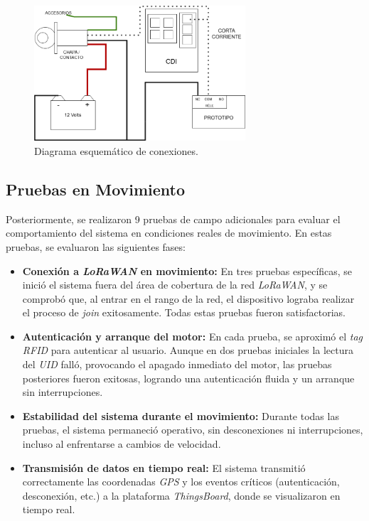 \begin{figure}[H]
\leavevmode
\begin{minipage}{\textwidth}
\begin{center}
\includegraphics[width=0.7\textwidth]{./capitulo_05/imagen/diagramaesquematico.png}
\caption{Diagrama esquemático de conexiones.\label{fig:esquematico}}
\end{center}
\end{minipage}
\end{figure}

\subsection{Pruebas en Movimiento}

Posteriormente, se realizaron 9 pruebas de campo adicionales para evaluar el comportamiento del sistema en condiciones reales de movimiento. En estas pruebas, se evaluaron las siguientes fases:

\begin{itemize}
    \item \textbf{Conexión a \textit{LoRaWAN} en movimiento:} En tres pruebas específicas, se inició el sistema fuera del área de cobertura de la red \textit{LoRaWAN}, y se comprobó que, al entrar en el rango de la red, el dispositivo lograba realizar el proceso de \textit{join} exitosamente. Todas estas pruebas fueron satisfactorias.
    \item \textbf{Autenticación y arranque del motor:} En cada prueba, se aproximó el \textit{tag RFID} para autenticar al usuario. Aunque en dos pruebas iniciales la lectura del \textit{UID} falló, provocando el apagado inmediato del motor, las pruebas posteriores fueron exitosas, logrando una autenticación fluida y un arranque sin interrupciones.
    \item \textbf{Estabilidad del sistema durante el movimiento:} Durante todas las pruebas, el sistema permaneció operativo, sin desconexiones ni interrupciones, incluso al enfrentarse a cambios de velocidad.
    \item \textbf{Transmisión de datos en tiempo real:} El sistema transmitió correctamente las coordenadas \textit{GPS} y los eventos críticos (autenticación, desconexión, etc.) a la plataforma \textit{ThingsBoard}, donde se visualizaron en tiempo real.
\end{itemize}

